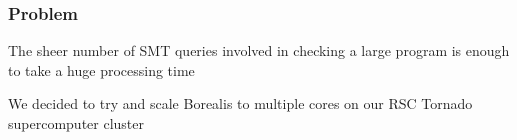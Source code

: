 
\begin{frame}
\frametitle{Problem}
\begin{block}{}
	\centering
	The sheer number of SMT queries involved in checking a large program is enough to take a huge processing time
\end{block}


\begin{block}{}
	\centering
	We decided to try and scale Borealis to multiple cores on our RSC Tornado supercomputer cluster
\end{block}
\end{frame}


\begin{frame}

\end{frame}